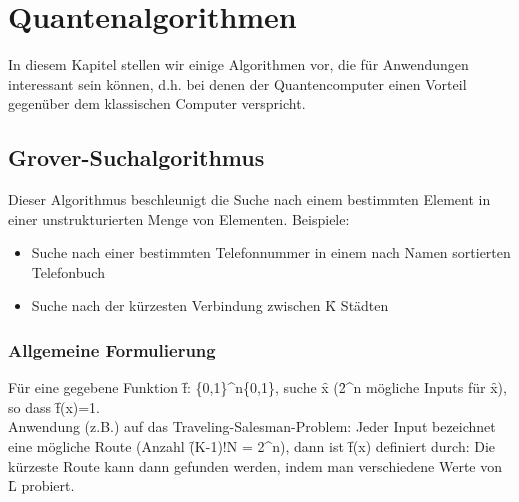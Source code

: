 \section{Quantenalgorithmen}
In diesem Kapitel stellen wir einige Algorithmen vor, die für Anwendungen interessant sein können, d.h. bei denen der Quantencomputer einen Vorteil gegenüber dem klassischen Computer verspricht.

\subsection{Grover-Suchalgorithmus}
Dieser Algorithmus beschleunigt die Suche nach einem bestimmten Element in einer unstrukturierten Menge von Elementen. Beispiele:
\begin{itemize}
    \item Suche nach einer bestimmten Telefonnummer in einem nach Namen sortierten Telefonbuch
    \item Suche nach der kürzesten Verbindung zwischen \f{K} Städten
\end{itemize}

\subsubsection{Allgemeine Formulierung}
Für eine gegebene Funktion \f{f: \left\{0,1\right\}^n\rightarrow\left\{0,1\right\}}, suche \f{x} (\f{2^n} mögliche Inputs für \f{x}), so dass \f{f(x)=1}.\\[0.5em]
Anwendung (z.B.) auf das Traveling-Salesman-Problem: Jeder Input bezeichnet eine mögliche Route (Anzahl \f{(K-1)!\leq N = 2^n}), dann ist \f{f(x)} definiert durch:
Die kürzeste Route kann dann gefunden werden, indem man verschiedene Werte von \f{L} probiert.


